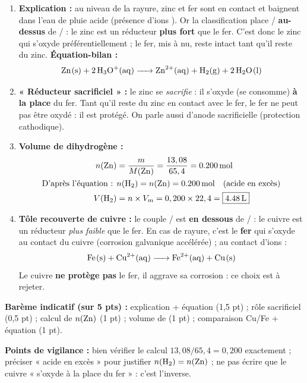 \documentclass[11pt]{article}
\newcommand{\cle}[1]{{\popxbold\color{popdark}#1}}
\begin{document}
\begin{corrige}
\begin{enumerate}
    \item \textbf{Explication :} au niveau de la rayure, zinc et fer sont en contact et baignent dans l'eau de pluie acide (présence d'ions ). Or la classification place / \textbf{au-dessus} de / : le zinc est un réducteur \textbf{plus fort} que le fer. C'est donc le zinc qui s'oxyde préférentiellement ; le fer, mis à nu, reste intact tant qu'il reste du zinc.
    \textbf{Équation-bilan :}
    \[ \ce{Zn(s) + 2H3O+(aq) -> Zn^2+(aq) + H2(g) + 2H2O(l)} \]
    \item \textbf{« Réducteur sacrificiel » :} le zinc se \emph{sacrifie} : il s'oxyde (se consomme) \textbf{à la place} du fer. Tant qu'il reste du zinc en contact avec le fer, le fer ne peut pas être oxydé : il est protégé. On parle aussi d'\cle{anode sacrificielle} (protection cathodique).
    \item \textbf{Volume de dihydrogène :}
    \begin{align*}
        n(\ce{Zn}) &= \frac{m}{M(\ce{Zn})} = \frac{13,08}{65,4} = \SI{0,200}{mol} \\
        \text{D'après l'équation : } & n(\ce{H2}) = n(\ce{Zn}) = \SI{0,200}{mol} \quad (\text{acide en excès}) \\
        V(\ce{H2}) &= n \times V_m = 0,200 \times 22,4 = \boxed{\SI{4,48}{L}}
    \end{align*}
    \item \textbf{Tôle recouverte de cuivre :} le couple / est \textbf{en dessous} de / : le cuivre est un réducteur \emph{plus faible} que le fer. En cas de rayure, c'est le \textbf{fer} qui s'oxyde au contact du cuivre (corrosion galvanique accélérée) ; au contact d'ions  :
    \[ \ce{Fe(s) + Cu^2+(aq) -> Fe^2+(aq) + Cu(s)} \]
    Le cuivre \textbf{ne protège pas} le fer, il aggrave sa corrosion : ce choix est à rejeter.
\end{enumerate}
\textbf{Barème indicatif (sur 5 pts) :} explication + équation (1,5 pt) ; rôle sacrificiel (0,5 pt) ; calcul de $n(\ce{Zn})$ (1 pt) ; volume de  (1 pt) ; comparaison Cu/Fe + équation (1 pt).

\textbf{Points de vigilance :} bien vérifier le calcul $13,08 / 65,4 = 0,200$ exactement ; préciser « acide en excès » pour justifier $n(\ce{H2}) = n(\ce{Zn})$ ; ne pas écrire que le cuivre « s'oxyde à la place du fer » : c'est l'inverse.
\end{corrige}
\end{document}
